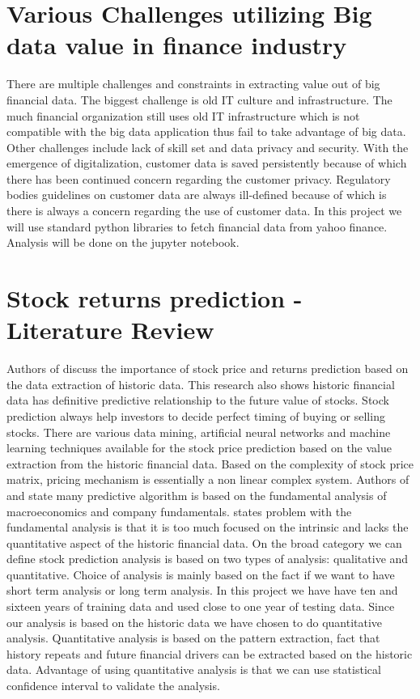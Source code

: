 \section{Various Challenges utilizing Big data value in finance industry }

There are multiple challenges and constraints in extracting value out of big financial data. The biggest challenge is old IT culture and infrastructure.
 The much financial organization still uses old IT infrastructure which is not compatible with the big data application thus fail to take advantage of big data.
 Other challenges include lack of skill set and data privacy and security. With the emergence of digitalization, customer data is saved persistently because of 
 which there has been continued concern regarding the customer privacy. Regulatory bodies guidelines on customer data are always ill-defined because of which is
 there is always a concern regarding the use of customer data.  In this project we will use standard python libraries to fetch financial data from yahoo finance. 
 Analysis will be done on the jupyter notebook. 
 
\section{Stock returns prediction - Literature Review}

Authors of \cite{Ref8} discuss the importance of stock price and returns prediction based on the data extraction of historic data. This research \cite{Ref8}
also shows historic financial data has definitive predictive relationship to the future value of stocks. Stock prediction always help investors to decide perfect
timing of buying or selling stocks. There are various data mining, artificial neural networks and machine learning techniques available for the stock price prediction based on the value
extraction from the historic financial data. Based on the complexity of stock price matrix, pricing mechanism is essentially a non linear complex system. 
Authors of \cite{Ref9} and \cite{Ref10} state many predictive algorithm is based on the fundamental analysis of macroeconomics and company fundamentals.
\cite{Ref11} states problem with the fundamental analysis is that it is too much focused on the intrinsic and lacks the quantitative aspect of the historic financial
data. On the broad category we can define stock prediction analysis is based on two types of analysis: qualitative and quantitative. Choice of analysis is mainly 
based on the fact if we want to have short term analysis or long term analysis. In this project we have have ten and sixteen years of training data and used close to 
one year of testing data. Since our analysis is based on the historic data we have chosen to do quantitative analysis. Quantitative analysis is based on the pattern 
extraction, fact that history repeats and future financial drivers can be extracted based on the historic data. Advantage of using quantitative analysis is that we 
can use statistical confidence interval to validate the analysis. 

